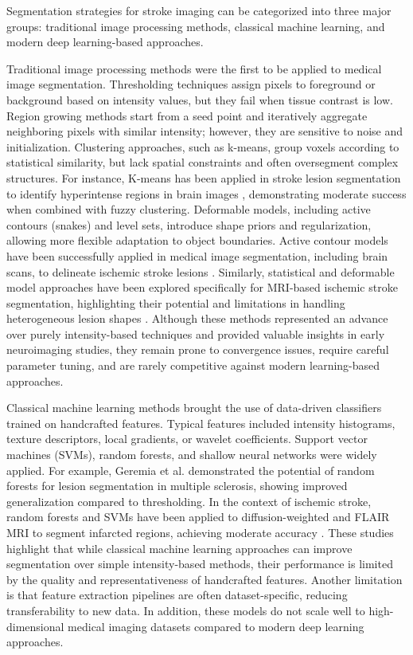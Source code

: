\documentclass[12pt]{article}
\begin{document}
Segmentation strategies for stroke imaging can be categorized into three major groups: traditional image processing methods, classical machine learning, and modern deep learning-based approaches.

Traditional image processing methods were the first to be applied to medical image segmentation. Thresholding techniques assign pixels to foreground or background based on intensity values, but they fail when tissue contrast is low. Region growing methods start from a seed point and iteratively aggregate neighboring pixels with similar intensity; however, they are sensitive to noise and initialization. Clustering approaches, such as k-means, group voxels according to statistical similarity, but lack spatial constraints and often oversegment complex structures. For instance, K-means has been applied in stroke lesion segmentation to identify hyperintense regions in brain images \cite{inproceedings}, demonstrating moderate success when combined with fuzzy clustering. Deformable models, including active contours (snakes) and level sets, introduce shape priors and regularization, allowing more flexible adaptation to object boundaries. Active contour models have been successfully applied in medical image segmentation, including brain scans, to delineate ischemic stroke lesions \cite{qianActiveContourModel2013}. Similarly, statistical and deformable model approaches have been explored specifically for MRI-based ischemic stroke segmentation, highlighting their potential and limitations in handling heterogeneous lesion shapes \cite{steinStatisticalDeformableModel2001}. Although these methods represented an advance over purely intensity-based techniques and provided valuable insights in early neuroimaging studies, they remain prone to convergence issues, require careful parameter tuning, and are rarely competitive against modern learning-based approaches.

Classical machine learning methods brought the use of data-driven classifiers trained on handcrafted features. Typical features included intensity histograms, texture descriptors, local gradients, or wavelet coefficients. Support vector machines (SVMs), random forests, and shallow neural networks were widely applied. For example, Geremia et al. \cite{geremiaSpatialDecisionForests2011} demonstrated the potential of random forests for lesion segmentation in multiple sclerosis, showing improved generalization compared to thresholding. In the context of ischemic stroke, random forests and SVMs have been applied to diffusion-weighted and FLAIR MRI to segment infarcted regions, achieving moderate accuracy \cite{inproceedings}. These studies highlight that while classical machine learning approaches can improve segmentation over simple intensity-based methods, their performance is limited by the quality and representativeness of handcrafted features. Another limitation is that feature extraction pipelines are often dataset-specific, reducing transferability to new data. In addition, these models do not scale well to high-dimensional medical imaging datasets compared to modern deep learning approaches.
\end{document}
